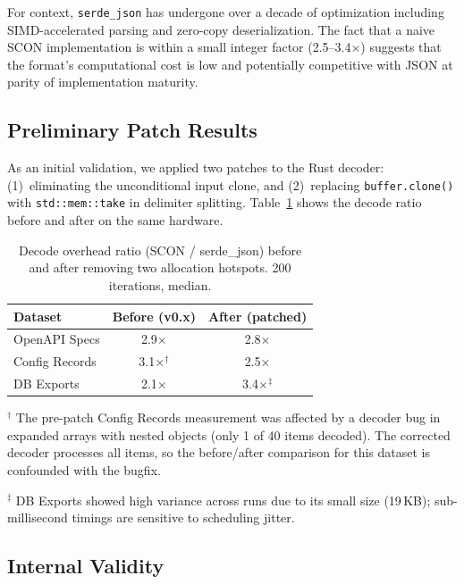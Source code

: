 \documentclass[11pt, a4paper]{article}
\begin{document}
\noindent For context, \texttt{serde\_json} has undergone over a decade of
optimization including SIMD-accelerated parsing and zero-copy deserialization.
The fact that a naive SCON implementation is within a small integer factor
(2.5--3.4$\times$) suggests that the format's computational cost is low
and potentially competitive with JSON at parity of implementation maturity.

\subsection{Preliminary Patch Results}
\label{sec:patch}

As an initial validation, we applied two patches to the Rust decoder:
(1)~eliminating the unconditional input clone, and
(2)~replacing \texttt{buffer.clone()} with \texttt{std::mem::take} in
delimiter splitting. Table~\ref{tab:patch} shows the decode ratio
before and after on the same hardware.

\begin{table}[ht]
\centering
\caption{Decode overhead ratio (SCON / serde\_json) before and after
         removing two allocation hotspots. 200 iterations, median.}
\label{tab:patch}
\begin{tabular}{l cc}
\toprule
Dataset & Before (v0.x) & After (patched) \\
\midrule
OpenAPI Specs   & 2.9$\times$ & 2.8$\times$ \\
Config Records  & 3.1$\times$$^\dagger$ & 2.5$\times$ \\
DB Exports      & 2.1$\times$ & 3.4$\times$$^\ddagger$ \\
\bottomrule
\end{tabular}

\smallskip
\noindent $^\dagger$ The pre-patch Config Records measurement was affected by
a decoder bug in expanded arrays with nested objects (only 1 of 40 items
decoded). The corrected decoder processes all items, so the before/after
comparison for this dataset is confounded with the bugfix.

\noindent $^\ddagger$ DB Exports showed high variance across runs due to
its small size (19\,KB); sub-millisecond timings are sensitive to
scheduling jitter.
\end{table}

\subsection{Internal Validity}
\label{sec:validity}
\end{document}

